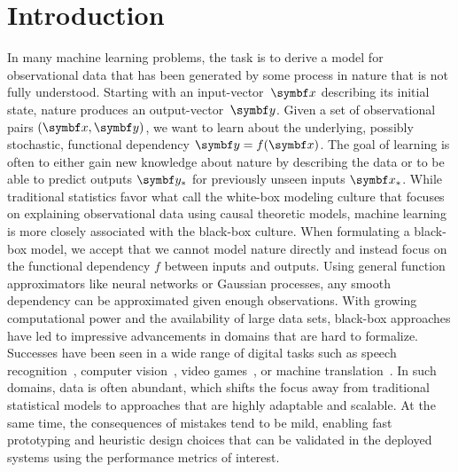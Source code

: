 \chapter{Introduction}
\label{toc:introduction}
In many machine learning problems, the task is to derive a model for observational data that has been generated by some process in nature that is not fully understood.
Starting with an input-vector~$\mat{x}$ describing its initial state, nature produces an output-vector~$\mat{y}$.
Given a set of observational pairs $(\mat{x}, \mat{y})$, we want to learn about the underlying, possibly stochastic, functional dependency $\mat{y} = f(\mat{x})$.
The goal of learning is often to either gain new knowledge about nature by describing the data or to be able to predict outputs $\mat{y}_\ast$ for previously unseen inputs $\mat{x}_\ast$.
While traditional statistics favor what \textcite{breiman_statistical_2001,shmueli_explain_2010} call the white-box modeling culture that focuses on explaining observational data using causal theoretic models, machine learning is more closely associated with the black-box culture.
When formulating a black-box model, we accept that we cannot model nature directly and instead focus on the functional dependency $f$ between inputs and outputs.
Using general function approximators like neural networks or Gaussian processes, any smooth dependency can be approximated given enough observations.
With growing computational power and the availability of large data sets, black-box approaches have led to impressive advancements in domains that are hard to formalize.
Successes have been seen in a wide range of digital tasks such as speech recognition~\parencite{hochreiter_long_1997,chorowski_attention-based_2015,bahdanau_neural_2014,chorowski_attention-based_2015}, computer vision~\parencite{russakovsky_imagenet_2015,lecun_backpropagation_1989}, video games~\parencite{berner_dota_2019,silver_mastering_2016}, or machine translation~\parencite{johnson_googles_2017}.
In such domains, data is often abundant, which shifts the focus away from traditional statistical models to approaches that are highly adaptable and scalable.
At the same time, the consequences of mistakes tend to be mild, enabling fast prototyping and heuristic design choices that can be validated in the deployed systems using the performance metrics of interest.

